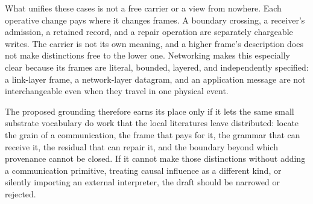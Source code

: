 \documentclass[11pt,a4paper]{article}
\theoremstyle{remark}\newtheorem{remark}[definition]{Remark}
\begin{document}
What unifies these cases is not a free carrier or a view from nowhere. Each
operative change pays where it changes frames. A boundary crossing, a receiver's
admission, a retained record, and a repair operation are separately chargeable
writes. The carrier is not its own meaning, and a higher frame's description does
not make distinctions free to the lower one. Networking makes this especially
clear because its frames are literal, bounded, layered, and independently
specified: a link-layer frame, a network-layer datagram, and an application
message are not interchangeable even when they travel in one physical event.

The proposed grounding therefore earns its place only if it lets the same small
substrate vocabulary do work that the local literatures leave distributed: locate
the grain of a communication, the frame that pays for it, the grammar that can
receive it, the residual that can repair it, and the boundary beyond which
provenance cannot be closed. If it cannot make those distinctions without adding
a communication primitive, treating causal influence as a different kind, or
silently importing an external interpreter, the draft should be narrowed or
rejected.
\end{document}
